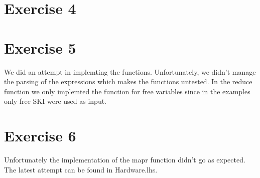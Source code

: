 \documentclass{article}
\begin{document}
\section*{Exercise 4}
\section*{Exercise 5}
We did an attempt in implemting the functions. Unfortunately, we didn't manage the parsing of the expressions which makes the functions untested. In the reduce function we only implemted the function for free variables since in the examples only free SKI were used as input.

\section*{Exercise 6}
Unfortunately the implementation of the mapr function didn't go as expected. The latest attempt can be found in Hardware.lhs.
\end{document}
